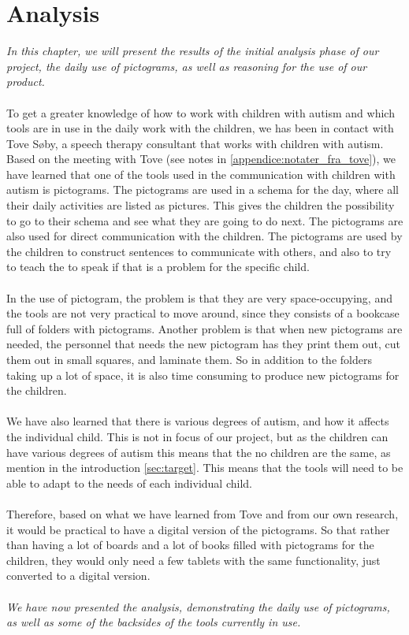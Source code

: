 \chapter{Analysis}

\textit{In this chapter, we will present the results of the initial analysis phase of our project, the daily use of pictograms, as well as reasoning for the use of our product.}\\
\\
To get a greater knowledge of how to work with children with autism and which tools are in use in the daily work with the children, we has been in contact with  Tove S\o{}by, a speech therapy consultant that works with children with autism.\\ 

Based on the meeting with Tove (see notes in \autoref{appendice:notater_fra_tove}), we have learned that one of the tools used in the communication with children with autism is pictograms.
The pictograms are used in a schema for the day, where all their daily activities are listed as pictures. This gives the children the possibility to go to their schema and see what they are going to do next. The pictograms are also used for direct communication with the children. The pictograms are used by the children to construct sentences to communicate with others, and also to try to teach the to speak if that is a problem for the specific child.\\
\\
In the use of pictogram, the problem is that they are very space-occupying, and the tools are not very practical to move around, since they consists of a bookcase full of folders with pictograms. Another problem is that when new pictograms are needed, the personnel that needs the new pictogram has they  print them out, cut them out in small squares, and laminate them. So in addition to the folders taking up a lot of space, it is also time consuming to produce new pictograms for the children.\\ 
\\
We have also learned that there is various degrees of autism, and how it affects the individual child. This is not in focus of our project, but as the children can have various degrees of autism this means that the no children are the same, as mention in the introduction \autoref{sec:target}. This means that the tools will need to be able to adapt to the needs of each individual child.\\
\\ 
Therefore, based on what we have learned from Tove and from our own research, it would be practical to have a digital version of the pictograms. So that rather than having a lot of boards and a lot of books filled with pictograms for the children, they would only need a few tablets with the same functionality, just converted to a digital version.\\
\\
\textit{We have now presented the analysis, demonstrating the daily use of pictograms, as well as some of the backsides of the tools currently in use. }